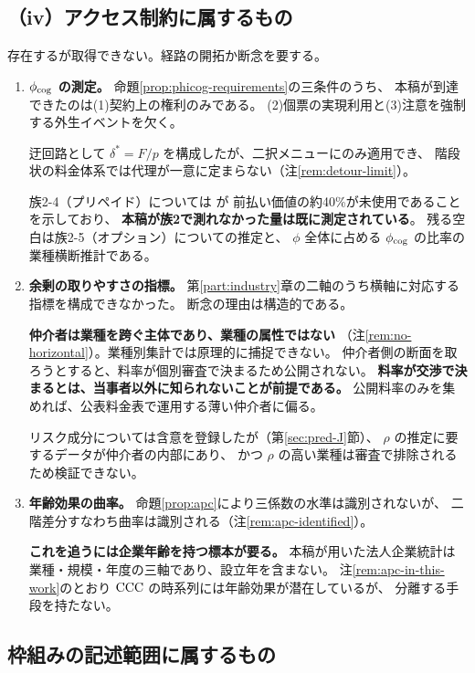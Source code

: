 \subsection{（iv）アクセス制約に属するもの}

存在するが取得できない。経路の開拓か断念を要する。

\begin{enumerate}[label=(\arabic*),start=6]
\item \textbf{$\phi_{\rm cog}$ の測定。}
命題\ref{prop:phicog-requirements}の三条件のうち、
本稿が到達できたのは(1)契約上の権利のみである。
(2)個票の実現利用と(3)注意を強制する外生イベントを欠く。

迂回路として $\delta^{*}=F/p$ を構成したが、二択メニューにのみ適用でき、
階段状の料金体系では代理が一意に定まらない（注\ref{rem:detour-limit}）。

族2-4（プリペイド）については \cite{nber2026pnbl} が
前払い価値の約40\%が未使用であることを示しており、
\textbf{本稿が族2で測れなかった量は既に測定されている}。
残る空白は族2-5（オプション）についての推定と、
$\phi$ 全体に占める $\phi_{\rm cog}$ の比率の業種横断推計である。

\item \textbf{余剰の取りやすさの指標。}
第\ref{part:industry}章の二軸のうち横軸に対応する指標を構成できなかった。
断念の理由は構造的である。

\textbf{仲介者は業種を跨ぐ主体であり、業種の属性ではない}
（注\ref{rem:no-horizontal}）。業種別集計では原理的に捕捉できない。
仲介者側の断面を取ろうとすると、料率が個別審査で決まるため公開されない。
\textbf{料率が交渉で決まるとは、当事者以外に知られないことが前提である。}
公開料率のみを集めれば、公表料金表で運用する薄い仲介者に偏る。

リスク成分については含意を登録したが（第\ref{sec:pred-J}節）、
$\rho$ の推定に要するデータが仲介者の内部にあり、
かつ $\rho$ の高い業種は審査で排除されるため検証できない。

\item \textbf{年齢効果の曲率。}
命題\ref{prop:apc}により三係数の水準は識別されないが、
二階差分すなわち曲率は識別される（注\ref{rem:apc-identified}）。

\textbf{これを追うには企業年齢を持つ標本が要る。}
本稿が用いた法人企業統計は業種・規模・年度の三軸であり、設立年を含まない。
注\ref{rem:apc-in-this-work}のとおり $\mathrm{CCC}$ の時系列には年齢効果が潜在しているが、
分離する手段を持たない。
\end{enumerate}

\subsection{枠組みの記述範囲に属するもの}

